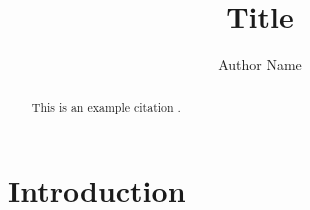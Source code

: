 \documentclass[stu, 12pt, floatsintext]{apa7}
\title{Title}
\author{Author Name}
\begin{document}
\maketitle

\begin{abstract}

  This is an example citation \parencite{kamp2022}.

\end{abstract}

\section{Introduction}

\printbibliography
\end{document}
